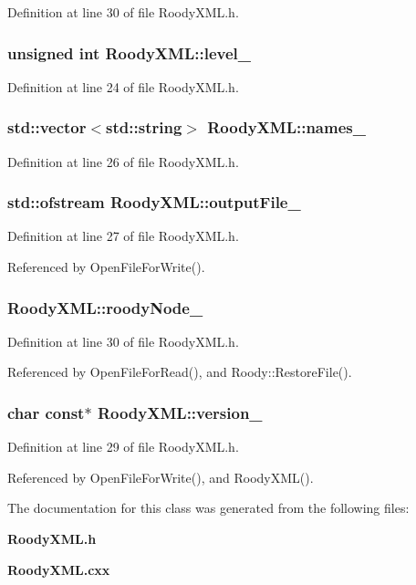 Definition at line 30 of file RoodyXML.h.
\subsubsection[{level\_\-}]{\setlength{\rightskip}{0pt plus 5cm}unsigned int {\bf RoodyXML::level\_\-}}\label{classRoodyXML_a0fb9f479a4f734f5180998eca8bfdc09}


Definition at line 24 of file RoodyXML.h.
\subsubsection[{names\_\-}]{\setlength{\rightskip}{0pt plus 5cm}std::vector$<$std::string$>$ {\bf RoodyXML::names\_\-}}\label{classRoodyXML_ad40dc30eaa3b55680ab6c1df36756e7b}


Definition at line 26 of file RoodyXML.h.
\subsubsection[{outputFile\_\-}]{\setlength{\rightskip}{0pt plus 5cm}std::ofstream {\bf RoodyXML::outputFile\_\-}}\label{classRoodyXML_a5f17248290685e651b5a162162da86e2}


Definition at line 27 of file RoodyXML.h.

Referenced by OpenFileForWrite().
\subsubsection[{roodyNode\_\-}]{ {\bf RoodyXML::roodyNode\_\-}}\label{classRoodyXML_a797be69bcbaf3e591569afdb30aadf25}


Definition at line 30 of file RoodyXML.h.

Referenced by OpenFileForRead(), and Roody::RestoreFile().
\subsubsection[{version\_\-}]{\setlength{\rightskip}{0pt plus 5cm}char const$\ast$ {\bf RoodyXML::version\_\-}}\label{classRoodyXML_a1698ed1c310b3cdced139dd541c7755d}


Definition at line 29 of file RoodyXML.h.

Referenced by OpenFileForWrite(), and RoodyXML().

The documentation for this class was generated from the following files:\begin{DoxyCompactItemize}
\item 
{\bf RoodyXML.h}\item 
{\bf RoodyXML.cxx}\end{DoxyCompactItemize}
